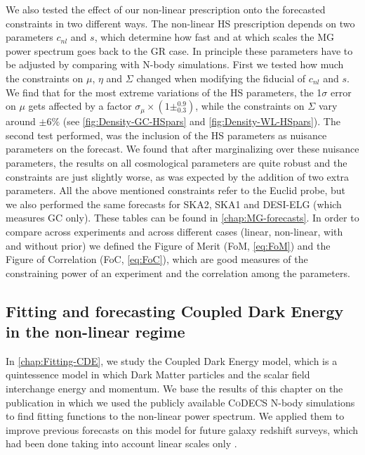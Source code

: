 We also tested the effect of our non-linear prescription onto the forecasted constraints in two different ways. The non-linear HS
prescription depends on two parameters $c_{nl}$ and $s$, which determine how fast and at which scales the MG power spectrum
goes back to the GR case. In principle these parameters have to be adjusted by comparing with N-body simulations. First we tested how much the constraints 
on $\mu$, $\eta$ and $\Sigma$ changed when  modifying the fiducial of $c_{nl}$ and $s$. We find that for the most extreme variations
of the HS parameters, the 1$\sigma$ error on $\mu$ gets affected by a factor $\sigma_{\mu} \times (1\pm^{0.9}_{0.3})$, while the constraints on $\Sigma$ vary around $\pm 6\%$
(see \cref{fig:Density-GC-HSpars} and \cref{fig:Density-WL-HSpars}).
The second test performed, was the inclusion of the HS parameters as nuisance parameters on the forecast. 
We found that after marginalizing over these nuisance parameters, the results on all cosmological parameters are quite robust and the constraints are just slightly worse, as was expected by the addition
of two extra parameters.
All the above mentioned constraints refer to the Euclid probe, but we also performed the same forecasts for SKA2, SKA1 and DESI-ELG (which measures GC only). These tables can be found in \cref{chap:MG-forecasts}.
In order to compare across experiments and across different cases (linear, non-linear, with and without prior) we defined the Figure of Merit (FoM, \cref{eq:FoM})
and the Figure of Correlation (FoC, \cref{eq:FoC}), which are good measures of the constraining power of an experiment and the correlation among the parameters.

 
\subsection*{Fitting and forecasting Coupled Dark Energy in the non-linear regime}


In \cref{chap:Fitting-CDE}, we study the Coupled Dark Energy model, which is a quintessence model in which Dark Matter particles and the scalar field interchange
energy and momentum. We base the results of this chapter on the publication \cite{casas_fitting_2016} in which we used the publicly available \textsc{CoDECS} N-body simulations \cite{baldi_codecs_2012} 
to find fitting functions to the non-linear power spectrum. We applied them to improve previous forecasts on this model for future galaxy redshift surveys, which had been done taking
into account linear scales only \cite{amendola2012testing}. 

